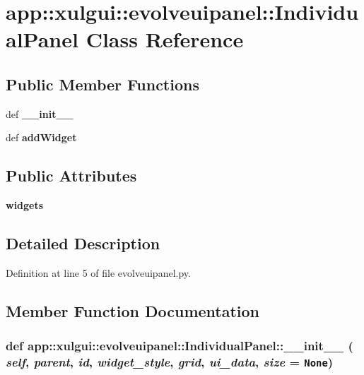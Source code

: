 \section{app::xulgui::evolveuipanel::IndividualPanel Class Reference}
\label{classapp_1_1xulgui_1_1evolveuipanel_1_1IndividualPanel}
\subsection*{Public Member Functions}
\begin{CompactItemize}
\item 
def {\bf \_\-\_\-init\_\-\_\-}
\item 
def {\bf addWidget}
\end{CompactItemize}
\subsection*{Public Attributes}
\begin{CompactItemize}
\item 
{\bf widgets}
\end{CompactItemize}


\subsection{Detailed Description}


Definition at line 5 of file evolveuipanel.py.

\subsection{Member Function Documentation}
\subsubsection{\setlength{\rightskip}{0pt plus 5cm}def app::xulgui::evolveuipanel::IndividualPanel::\_\-\_\-init\_\-\_\- ( {\em self},  {\em parent},  {\em id},  {\em widget\_\-style},  {\em grid},  {\em ui\_\-data},  {\em size} = {\tt None})}\label{classapp_1_1xulgui_1_1evolveuipanel_1_1IndividualPanel_b3cd2393afe275ee7048794b20c79ada}




